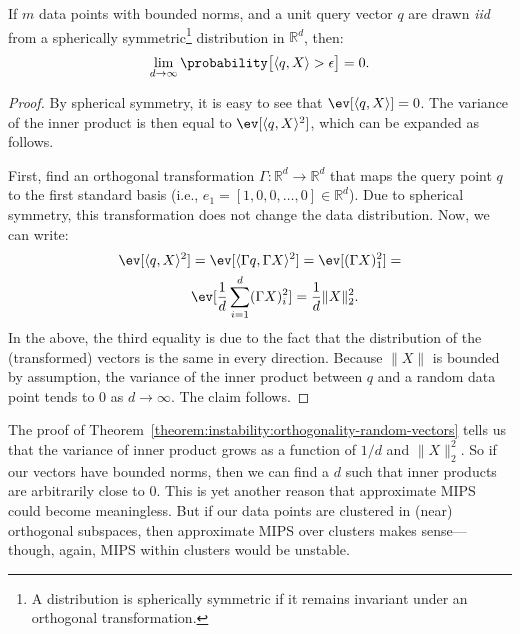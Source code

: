 \begin{theorem}
    \label{theorem:instability:orthogonality-random-vectors}
    If $m$ data points with bounded norms,
    and a unit query vector $q$ are drawn \emph{iid}
    from a spherically symmetric\footnote{A distribution is spherically symmetric
    if it remains invariant under an orthogonal transformation.}
    distribution in $\mathbb{R}^d$, then:
    \begin{equation*}
        \lim_{d \rightarrow \infty} \probability\big[ \langle q, X \rangle > \epsilon \big] = 0.
    \end{equation*}
\end{theorem}
\begin{proof}
    By spherical symmetry, it is easy to see that $\ev[\langle q, X \rangle] = 0$.
    The variance of the inner product is then equal to $\ev[\langle q, X \rangle^2]$,
    which can be expanded as follows.
    
    First, find an orthogonal transformation $\Gamma: \mathbb{R}^d \rightarrow \mathbb{R}^d$ that maps
    the query point $q$ to the first standard basis (i.e., $e_1 = [1, 0, 0, \ldots, 0] \in \mathbb{R}^d$).
    Due to spherical symmetry, this transformation does not change the data distribution.
    Now, we can write:
    \begin{align*}
        \ev[\langle q, X \rangle^2] &= \ev[ \langle \Gamma q, \Gamma X \rangle^2] =
        \ev[(\Gamma X)_1^2] = \\
        &\ev[\frac{1}{d} \sum_{i=1}^d (\Gamma X)_i^2] = \frac{1}{d} \lVert X \rVert_2^2.
    \end{align*}
    In the above, the third equality is due to the fact that the distribution of the (transformed)
    vectors is the same in every direction. Because $\lVert X \rVert$ is bounded by assumption, the
    variance of the inner product between $q$ and a random data point tends to $0$ as $d \rightarrow \infty$.
    The claim follows.
\end{proof}

\begin{svgraybox}
The proof of Theorem~\ref{theorem:instability:orthogonality-random-vectors} tells us that
the variance of inner product grows as a function of $1/d$ and $\lVert X \rVert_2^2$.
So if our vectors have bounded norms, then we can find a $d$ such that inner products are
arbitrarily close to $0$. This is yet another reason that approximate MIPS could become meaningless.
But if our data points are clustered in (near) orthogonal subspaces, then approximate
MIPS over clusters makes sense---though, again, MIPS within clusters would be unstable.
\end{svgraybox}



